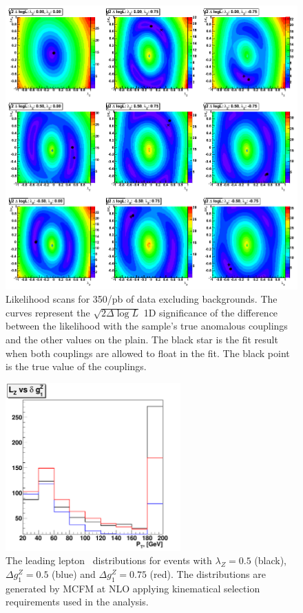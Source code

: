 \begin{figure}[tp]
  \centerline{
    \includegraphics[width=1.0\textwidth]{figures/validation_likelihood_scans.png}
  }

  \caption[Likelihood scan for Signal Monte Carlo] {Likelihood scans
    for 350/pb of data excluding backgrounds. The curves
    represent the $\sqrt{2\Delta\log L}$ 1D significance of the difference between the
    likelihood with the sample's true anomalous couplings and the other
    values on the plain. The black star is the fit result when both couplings are
    allowed to float in the fit. The black point is the true value of the couplings.}
  \label{fig:val_scans}
\end{figure}

\begin{figure}[tp]
  \centerline{
    \includegraphics[width=0.6\textwidth]{figures/lz_vs_dkg}
  }

  \caption[Leading lepton pt shape for different couplings]{The
  leading lepton \pt\ distributions for events with $\lambda_{Z}=0.5$
  (black), $\Delta g^Z_1=0.5$ (blue) and $\Delta g^Z_1=0.75$
  (red). The distributions are generated by MCFM at NLO applying
  kinematical selection requirements used in the analysis.} \label{fig:lz_vs_dkg}
\end{figure}


